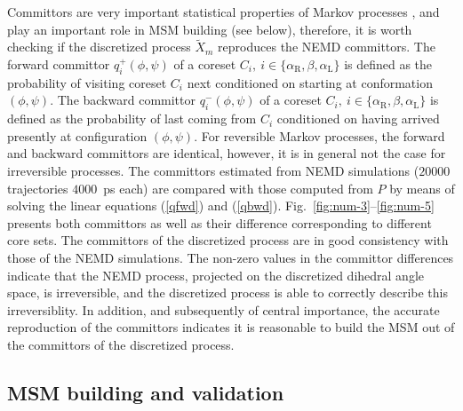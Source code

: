 \documentclass[aps, pre, preprint,unsortedaddress,a4paper,onecolumn]{revtex4}
\newcommand{\fwd}[0]{+}
\newcommand{\bwd}[0]{-}
\newcommand{\confaa}[0]{{\alpha_{\textrm{R}}}}
\newcommand{\confc}[0]{{\alpha_{\textrm{L}}}}
\begin{document}
Committors are very important statistical properties of Markov processes \cite{PrinzHeldSmithNoe_Committorprep,PNAS09}, and play
an important role in MSM building \cite{A19-31,A19-29,djurdjevac2010markov} (see below), therefore, it is worth
checking if the discretized process $\tilde X_m$ reproduces the NEMD committors.
The forward committor $q^\fwd_i(\phi,\psi)$ of a coreset $C_i,\
i\in\{\confaa, \beta, \confc\}$ is defined as the probability of
visiting coreset $C_i$ next conditioned on starting at conformation
$(\phi,\psi)$.  The backward committor $q^\bwd_i(\phi,\psi)$ of a
coreset $C_i,\ i\in\{\confaa, \beta, \confc\}$ is defined as the
probability of last coming from $C_i$ conditioned on having arrived presently at
configuration $(\phi,\psi)$.
For reversible Markov processes, the
forward and backward committors are identical, however, it is in
general not the case for irreversible processes.
The committors estimated from NEMD simulations ($20000$ trajectories $4000$~ps each) are compared with
those computed from $P$ by means of solving the linear equations (\ref{qfwd}) and (\ref{qbwd}).
Fig.~\ref{fig:num-3}--\ref{fig:num-5} presents both
committors as well as their difference corresponding to different core sets.
The committors of the discretized process are in good consistency with those of
the NEMD simulations. The non-zero values in the committor differences
indicate that the NEMD process, projected on the discretized
dihedral angle space, is irreversible, and
the discretized process is able to correctly describe this irreversiblity.
In addition, and subsequently of central importance, the accurate reproduction of the committors indicates it is reasonable to build the 
MSM out of the committors of the  discretized process.



\subsection{MSM building and validation}
\end{document}
